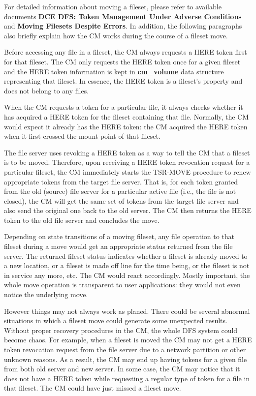 For detailed information about moving a fileset, please refer to available
documents {\bf DCE DFS: Token Management Under Adverse Conditions } and 
{\bf Moving Filesets Despite Errors}.
In addition, the following paragraphs also
briefly explain how the CM works during the course of a fileset move.

Before accessing any file in a fileset, the CM always requests a HERE token 
first for that fileset. The CM only requests the HERE token once for a given
fileset and the HERE token information is kept in {\bf cm_volume} data
structure representing that fileset. In essence, the HERE token is a fileset's
property and does not belong to any files. 

When the CM requests a token for a particular file, it always checks whether
it has acquired a HERE token for the fileset containing that file.
Normally, the CM would expect it already has the HERE token: the CM acquired
the HERE token when it first crossed the mount point of that fileset.

The file server uses revoking a HERE token as a way to tell the CM that a 
fileset is to be moved. Therefore, upon receiving a HERE token revocation
request for a particular fileset, the CM immediately starts
the TSR-MOVE procedure to renew appropriate tokens from the target file 
server. That is, for each token granted from the old (source) file server for 
a particular active file (i.e., the file is not closed),
the CM will get the same set of tokens from the target file server
and also send the original one back to the old server. The CM then returns
the HERE token to the old file server and concludes the move. 

Depending on state transitions of a moving fileset, 
any file operation to that fileset during a move would get an appropriate 
status returned from the file server. The returned fileset status
indicates whether a fileset is already moved to a new location, or a fileset 
is made off line for the time being, or the fileset is not in service any 
more, etc. The CM would react accordingly. 
Mostly important, the whole move operation is transparent 
to user applications: they would not even 
notice the underlying move. 

However things may not always work as planed. There could be several abnormal
situations in which a fileset move could generate some unexpected results.
Without proper recovery procedures in the CM, the whole DFS system could 
become chaos. 
For example, 
when a fileset is moved the CM may not get a HERE token revocation request 
from the file server due to a network partition or other unknown reasons. 
As a result, the CM may end up having tokens for a given file from both 
old server and new server. 
In some case, the CM may notice that it does not have a HERE token 
while requesting a regular type of token for a file in that fileset. 
The CM could have just missed a fileset move. 

